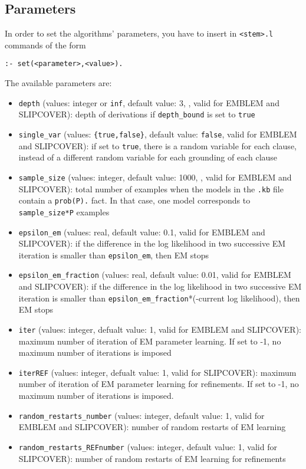 \documentclass[a4paper,10pt]{article}
\begin{document}
\subsection{Parameters}
In order to set the algorithms' parameters, you have to insert in \texttt{<stem>.l}  commands of the form
\begin{verbatim}
:- set(<parameter>,<value>).
\end{verbatim}
The available parameters are:
\begin{itemize}
\item \verb|depth| (values: integer or \verb|inf|, default value: 3, , valid for EMBLEM and SLIPCOVER): depth of derivations if  \verb|depth_bound|  is set to \verb|true|
\item \verb|single_var| (values: \verb|{true,false}|, default value: \verb|false|, valid for EMBLEM and SLIPCOVER): if set to \verb|true|, there is a random variable for each clause, instead of a different random variable for each grounding of each clause
\item \verb|sample_size| (values: integer, default value: 1000, , valid for EMBLEM and SLIPCOVER): total number of examples when the models in the \verb|.kb| file contain a \verb|prob(P).| fact. In that case, one model corresponds to \verb|sample_size*P| examples
\item \verb|epsilon_em| (values: real, default value: 0.1, valid for 
EMBLEM and SLIPCOVER): if the difference in the log likelihood in two successive EM iteration is smaller
than \verb|epsilon_em|, then EM stops 
\item \verb|epsilon_em_fraction| (values: real, default value: 0.01, valid for 
EMBLEM and SLIPCOVER): if the difference in the log likelihood in two successive EM iteration is smaller
than \verb|epsilon_em_fraction|*(-current log likelihood), then EM stops
\item \verb|iter| (values: integer, defualt value: 1, valid for EMBLEM and SLIPCOVER): maximum number of iteration of EM parameter learning. If set to -1, no maximum number of iterations is imposed
\item \verb|iterREF| (values: integer, defualt value: 1, valid for  
 SLIPCOVER):
 maximum number of iteration of EM parameter learning for refinements. If set to -1, no maximum number of iterations is imposed.
\item \verb|random_restarts_number| (values: integer, default value: 1, valid for EMBLEM and SLIPCOVER): number of random restarts of EM learning
\item \verb|random_restarts_REFnumber| (values: integer, default value: 1, valid for  SLIPCOVER): number of random restarts of EM learning for refinements

\end{itemize}
\end{document}
